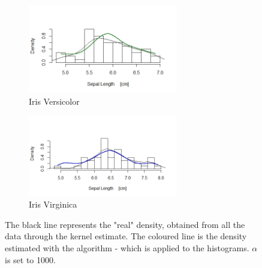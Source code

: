 \begin{figure}[ht]
	
	\begin{subfigure}{.5\textwidth}
		\includegraphics[width=6.5cm]{./pictures/iris/versicolor_100.jpeg} 
		\caption*{Iris Versicolor}
		\label{fig:versicolor}
	\end{subfigure}
	\begin{subfigure}{.5\textwidth}
		\includegraphics[width=6.5cm]{./pictures/iris/virginica_1000.jpeg}
		\caption*{Iris Virginica}
		\label{fig:virginica}
	\end{subfigure}
		
	\caption{The black line represents the "real" density, obtained from all the data through the kernel estimate. The coloured line is the density estimated with the algorithm - which is applied to the histograms. $\alpha$ is set to 1000.}
	\label{fig:iris_v}
	
\end{figure}








